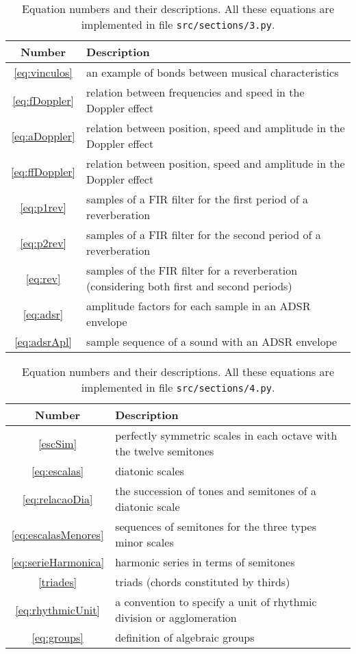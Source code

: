 \documentclass{scrreprt}
\newcommand*{\reff}[1]{%
	{\NoHyper\ref{#1}\endNoHyper}%
	  }
\begin{document}
\begin{table*}[htp!]
\centering
\caption{Equation numbers and their descriptions.
All these equations are implemented in file \texttt{src/sections/3.py}.}
\begin{tabular}{ c | p{12cm} }
   Number & Description \\\hline
 \reff{eq:vinculos} & an example of bonds between musical characteristics \\
 \reff{eq:fDoppler} & relation between frequencies and speed in the Doppler effect \\
 \reff{eq:aDoppler} & relation between position, speed and amplitude in the Doppler effect \\
 \reff{eq:ffDoppler} & relation between position, speed and amplitude in the Doppler effect \\
 \reff{eq:p1rev} & samples of a FIR filter for the first period of a reverberation \\
 \reff{eq:p2rev} & samples of a FIR filter for the second period of a reverberation \\
 \reff{eq:rev} & samples of the FIR filter for a reverberation (considering both first and second periods) \\
 \reff{eq:adsr} & amplitude factors for each sample in an ADSR envelope \\
 \reff{eq:adsrApl} & sample sequence of a sound with an ADSR envelope \\
\end{tabular}
\end{table*}

\begin{table*}[htp!]
\centering
\caption{Equation numbers and their descriptions.
All these equations are implemented in file \texttt{src/sections/4.py}.}
\begin{tabular}{ c | p{12cm} }
   Number & Description \\\hline
 \reff{escSim} & perfectly symmetric scales in each octave with the twelve semitones \\
 \reff{eq:escalas} & diatonic scales \\
 \reff{eq:relacaoDia} & the succession of tones and semitones of a diatonic scale \\
 \reff{eq:escalasMenores} & sequences of semitones for the three types minor scales \\
 \reff{eq:serieHarmonica} & harmonic series in terms of semitones \\
 \reff{triades} & triads (chords constituted by thirds) \\
 \reff{eq:rhythmicUnit} & a convention to specify a unit of rhythmic division or agglomeration \\
 \reff{eq:groups} & definition of algebraic groups \\
\end{tabular}
\end{table*}
\end{document}
